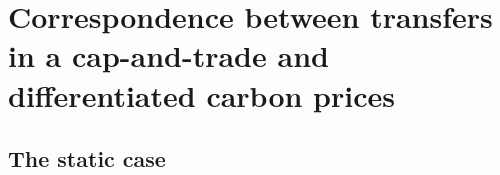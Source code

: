 \documentclass[12pt,english]{article}
\begin{document}

  \begin{small} %

\end{small}  %


%  


\clearpage
\renewcommand{\url}[1]{\href{#1}{Link}} %


\appendix
\renewcommand{\thetable}{A\arabic{table}}
\renewcommand{\thefigure}{A\arabic{figure}}
\setcounter{figure}{0}
\setcounter{table}{0}

\clearpage
\section{Correspondence between transfers in a cap-and-trade and
differentiated carbon
prices}\label{app:correspondence}

\subsection{The static case}\label{the-static-case}
\end{document}
